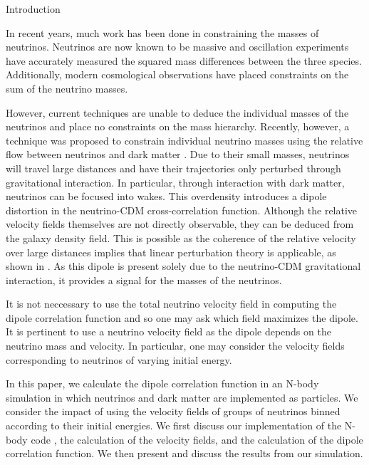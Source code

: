 \begin{section}{Introduction}
  \label{sec:introduction}

In recent years, much work has been done in constraining the masses
of neutrinos. Neutrinos are now known to be massive and oscillation 
experiments have accurately measured the squared mass differences 
between the three species. Additionally, modern cosmological 
observations have placed constraints on the sum of the neutrino 
masses.

\par However, current techniques are unable to deduce the 
individual masses of the neutrinos and place no constraints 
on the mass hierarchy. Recently, however, a technique was 
proposed to constrain individual neutrino masses using the 
relative flow between neutrinos and dark matter \cite{bib:Zhu2013, 
bib:Zhu2014}. Due to their small masses, neutrinos will 
travel large distances and have their trajectories only
 perturbed through gravitational interaction. In particular, 
through interaction with dark matter, neutrinos can be focused 
into wakes. This overdensity introduces a dipole distortion 
in the neutrino-CDM cross-correlation function. Although the 
relative velocity fields themselves are not directly observable, 
they can be deduced from the galaxy density field. This is possible as the 
coherence of the relative velocity over large distances implies 
that linear perturbation theory is applicable, as shown in 
\cite{bib:Inman}. As this dipole is present solely due to the neutrino-CDM 
gravitational interaction, it provides a signal for the masses 
of the neutrinos.

\par It is not neccessary to use the total neutrino velocity field 
in computing the dipole correlation function and so one may ask which 
field maximizes the dipole. It is pertinent 
to use a neutrino velocity field as the dipole depends on the 
neutrino mass and velocity. In particular, one may consider the 
velocity fields corresponding to neutrinos of varying initial 
energy. 

\par In this paper, we calculate the 
dipole correlation function in an N-body simulation in which
neutrinos and dark matter are implemented as particles. We consider 
the impact of using the velocity fields of groups of neutrinos binned  
according to their initial energies. We first discuss our implementation of 
the N-body code \cpm \cite{bib:HarnoisDeraps2013}, the calculation 
of the velocity fields, and the calculation of the dipole correlation 
function. We then present and discuss the results from our simulation.

\end{section}

